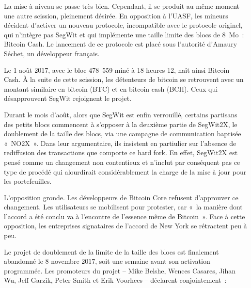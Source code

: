 La mise à niveau se passe très bien. Cependant, il se produit au même moment une autre scission, pleinement désirée. En opposition à l'UASF, les mineurs décident d'activer un nouveau protocole, incompatible avec le protocole originel, qui n'intègre pas SegWit et qui implémente une taille limite des blocs de 8~Mo~: Bitcoin Cash. Le lancement de ce protocole est placé sous l'autorité d'Amaury Séchet, un développeur français.

Le 1\ier{} août 2017, avec le bloc 478~559 miné à 18 heures 12, naît ainsi Bitcoin Cash. À la suite de cette scission, les détenteurs de bitcoin se retrouvent avec un montant similaire en bitcoin (BTC) et en bitcoin cash (BCH). Ceux qui désapprouvent SegWit rejoignent le projet.

Durant le mois d'août, alors que SegWit est enfin verrouillé, certains partisans des petits blocs commencent à s'opposer à la deuxième partie de SegWit2X, le doublement de la taille des blocs, via une campagne de communication baptisée «~NO2X~». Dans leur argumentaire, ils insistent en partiulier sur l'absence de rediffusion des transactions que comporte ce hard fork. En effet, SegWit2X est pensé comme un changement non contentieux et n'inclut par conséquent pas ce type de procédé qui alourdirait considérablement la charge de la mise à jour pour les portefeuilles.

L'opposition gronde. Les développeurs de Bitcoin Core refusent d'approuver ce changement. Les utilisateurs se mobilisent pour protester, car «~la manière dont l'accord a été conclu va à l'encontre de l'essence même de Bitcoin~». Face à cette opposition, les entreprises signataires de l'accord de New York se rétractent peu à peu.

Le projet de doublement de la limite de la taille des blocs est finalement abandonné le 8 novembre 2017, soit une semaine avant son activation programmée. Les promoteurs du projet -- Mike Belshe, Wences Casares, Jihan Wu, Jeff Garzik, Peter Smith et Erik Voorhees -- déclarent conjointement~:

